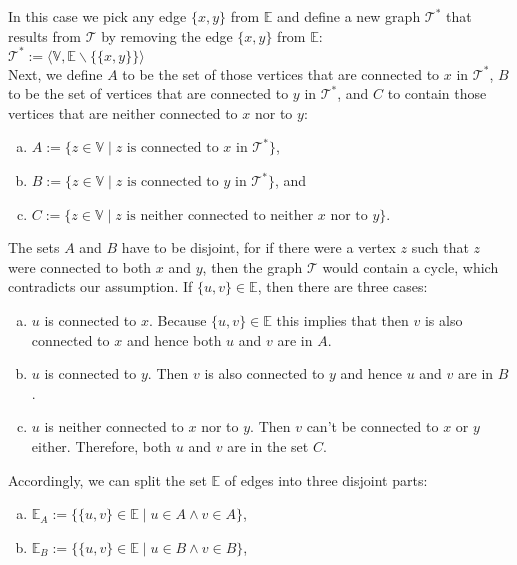\begin{enumerate}
  In this case we pick any edge $\{x,y\}$ from $\mathbb{E}$ and define a new graph $\mathcal{T}^*$ that results from $\mathcal{T}$
  by removing the edge $\{x,y\}$ from $\mathbb{E}$:
  \\[0.2cm]
  \hspace*{1.3cm}
  $\mathcal{T}^* := \bigl\langle \mathbb{V}, \mathbb{E} \backslash \bigl\{ \{x,y\} \bigr\} \bigr\rangle$ 
  \\[0.2cm]
  Next, we define $A$ to be the set of those vertices that are connected to $x$ in $\mathcal{T}^*$, $B$ to be the set
  of vertices that are connected to $y$ in $\mathcal{T}^*$, and $C$ to contain those vertices that are neither connected to
  $x$ nor to $y$:
  \begin{enumerate}[(a)]
  \item $A := \{ z \in \mathbb{V} \mid \mbox{$z$ is connected to $x$ in $\mathcal{T}^*$}\}$, \quad 
  \item $B := \{ z \in \mathbb{V} \mid \mbox{$z$ is connected to $y$ in $\mathcal{T}^*$}\}$, \quad and \quad
  \item $C := \{ z \in \mathbb{V} \mid \mbox{$z$ is neither connected to neither $x$ nor to $y$}\}$.
  \end{enumerate}
  The sets $A$ and $B$ have to be disjoint, for if there were a vertex $z$ such that $z$ were connected to both
  $x$ and $y$, then the graph $\mathcal{T}$ would contain a cycle, which contradicts our assumption.
  If $\{u,v\}\in\mathbb{E}$, then there are three cases:
  \begin{enumerate}[(a)]
  \item $u$ is connected to $x$.  Because $\{u,v\}\in\mathbb{E}$ this implies that then $v$ is also connected
        to $x$ and hence both $u$ and $v$ are in $A$.
  \item $u$ is connected to $y$.  Then $v$ is also connected to $y$ and hence $u$ and $v$ are in $B$.
  \item $u$ is neither connected to $x$ nor to $y$.  Then $v$ can't be connected to $x$ or $y$ either.
        Therefore, both $u$ and $v$ are in the set $C$.
  \end{enumerate}
  Accordingly, we can split the set $\mathbb{E}$ of edges into three disjoint parts:
  \begin{enumerate}[(a)]
  \item $\mathbb{E}_A := \bigl\{ \{u,v\}\in\mathbb{E} \mid u\in A \wedge v\in A \bigr\}$,
  \item $\mathbb{E}_B := \bigl\{ \{u,v\}\in\mathbb{E} \mid u\in B \wedge v\in B \bigr\}$,

\end{enumerate}
\end{enumerate}
